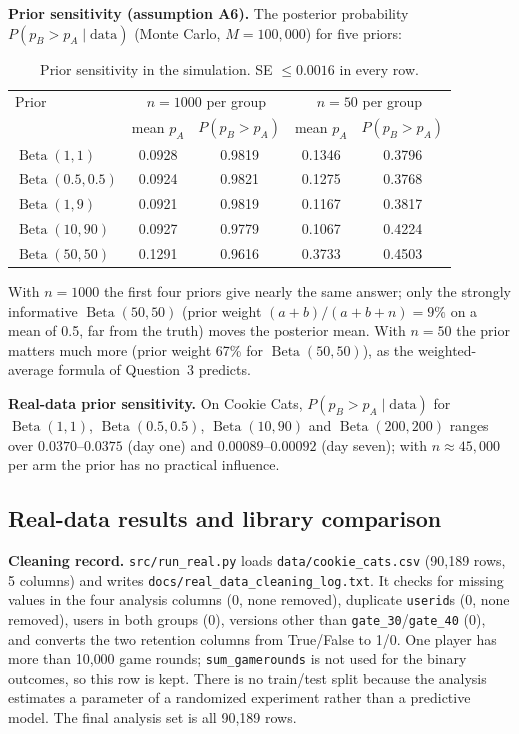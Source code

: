 \documentclass[11pt]{article}
\newcommand{\Beta}{\operatorname{Beta}}
\begin{document}
\textbf{Prior sensitivity (assumption A6).} The posterior probability $P(p_B>p_A\mid\text{data})$ (Monte Carlo, $M=100{,}000$) for five priors:
\begin{table}[H]\centering\small
\caption{Prior sensitivity in the simulation. SE $\le 0.0016$ in every row.}
\begin{tabular}{lcccc}\toprule
Prior & \multicolumn{2}{c}{$n=1000$ per group} & \multicolumn{2}{c}{$n=50$ per group}\\
 & mean $p_A$ & $P(p_B>p_A)$ & mean $p_A$ & $P(p_B>p_A)$\\\midrule
$\Beta(1,1)$ & 0.0928 & 0.9819 & 0.1346 & 0.3796\\
$\Beta(0.5,0.5)$ & 0.0924 & 0.9821 & 0.1275 & 0.3768\\
$\Beta(1,9)$ & 0.0921 & 0.9819 & 0.1167 & 0.3817\\
$\Beta(10,90)$ & 0.0927 & 0.9779 & 0.1067 & 0.4224\\
$\Beta(50,50)$ & 0.1291 & 0.9616 & 0.3733 & 0.4503\\\bottomrule
\end{tabular}
\end{table}
With $n=1000$ the first four priors give nearly the same answer; only the strongly informative $\Beta(50,50)$ (prior weight $(a+b)/(a+b+n)=9\%$ on a mean of 0.5, far from the truth) moves the posterior mean. With $n=50$ the prior matters much more (prior weight 67\% for $\Beta(50,50)$), as the weighted-average formula of Question~3 predicts.

\textbf{Real-data prior sensitivity.} On Cookie Cats, $P(p_B>p_A\mid\text{data})$ for $\Beta(1,1)$, $\Beta(0.5,0.5)$, $\Beta(10,90)$ and $\Beta(200,200)$ ranges over $0.0370$--$0.0375$ (day one) and $0.00089$--$0.00092$ (day seven); with $n\approx45{,}000$ per arm the prior has no practical influence.

\subsection{Real-data results and library comparison}
\textbf{Cleaning record.} \texttt{src/run\_real.py} loads \texttt{data/cookie\_cats.csv} (90{,}189 rows, 5 columns) and writes \texttt{docs/real\_data\_cleaning\_log.txt}. It checks for missing values in the four analysis columns (0, none removed), duplicate \texttt{userid}s (0, none removed), users in both groups (0), versions other than \texttt{gate\_30}/\texttt{gate\_40} (0), and converts the two retention columns from True/False to 1/0. One player has more than 10{,}000 game rounds; \texttt{sum\_gamerounds} is not used for the binary outcomes, so this row is kept. There is no train/test split because the analysis estimates a parameter of a randomized experiment rather than a predictive model. The final analysis set is all 90{,}189 rows.
\end{document}
